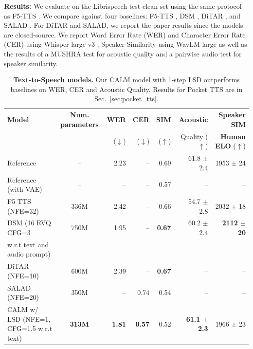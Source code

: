 \noindent\textbf{Results:} We evaluate on the Librispeech test-clean set using the same protocol as F5-TTS \citep{f5tts}. We compare against four baselines: F5-TTS \citep{f5tts}, DSM \citep{delayed_stream_modeling}, DiTAR \citep{ditar}, and SALAD \citep{salad}. For DiTAR and SALAD, we report the paper results since the models are closed-source. We report Word Error Rate (WER) and Character Error Rate (CER) using Whisper-large-v3 \citep{whisper}, Speaker Similarity using WavLM-large \citep{wavlm} as well as the results of a MUSHRA test for acoustic quality and a pairwise audio test for speaker similarity.
\begin{table}[h]
\caption{\textbf{Text-to-Speech models.} Our CALM model with 1-step LSD outperforms baselines on WER, CER and Acoustic Quality. Results for Pocket TTS are in Sec.~\ref{sec:pocket_tts}.}
\centering
\scriptsize %
\setlength{\tabcolsep}{4pt} %
\renewcommand{\arraystretch}{0.95} %
\begin{tiny}
{
\begin{sc}

\begin{tabular}{lcrrrrr}
\toprule
\textbf{Model} & \textbf{Num. parameters} & \textbf{WER} & \textbf{CER}& \textbf{SIM} & \textbf{Acoustic}  & \textbf{Speaker SIM} \\
 &  & ($\downarrow$) & ($\downarrow$) & ($\uparrow$) & Quality ($\uparrow$) & \textbf{Human ELO} ($\uparrow$) \\
\midrule
Reference & -- & 2.23 & -- & 0.69 & 61.8 $\pm$ 2.4 & 1953 $\pm$ 24 \\
Reference (with VAE) & -- & -- & -- & 0.57 & -- & --\\
\midrule
F5 TTS (NFE=32) \citep{f5tts} & 336M & 2.42 & -- & 0.66 & 54.7 $\pm$ 2.8 & 2032 $\pm$ 18 \\
DSM (16 RVQ CFG=3 & 750M & 1.95 & -- & \textbf{0.67} & 60.2 $\pm$ 2.4 & \textbf{2112 $\pm$ 20}\\
w.r.t text and audio prompt) \citep{delayed_stream_modeling} &  \\
DiTAR (NFE=10) \citep{ditar} & 600M & 2.39 & -- & \textbf{0.67} & -- & -- \\
SALAD (NFE=20) \citep{salad} & 350M & -- & 0.74 & 0.54 & -- & -- \\
\midrule
CALM w/ LSD (NFE=1, CFG=1.5 w.r.t text) & \textbf{313M} & \textbf{1.81} & \textbf{0.57} & 0.52 & \textbf{61.1 $\pm$ 2.3} & 1966 $\pm$ 23 \\
\bottomrule
\end{tabular}
\end{sc}
}
\end{tiny}
\label{tab:visqol}
\end{table}

